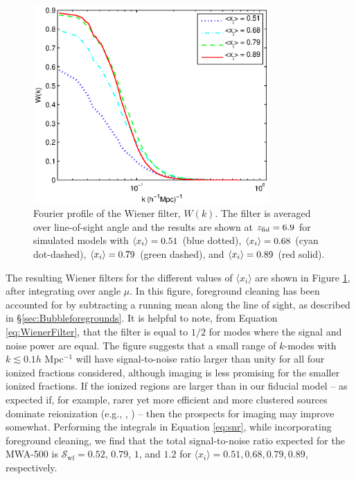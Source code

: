 \begin{figure}[h]
  \centering
  \includegraphics[width=9cm]{f1.eps}  
  \caption{Fourier profile of the Wiener filter, $W(k)$. The filter is averaged over
    line-of-sight angle and the results are shown at $z_{\rm fid} = 6.9$ for
simulated models with $\langle x_{i} \rangle = 0.51$ (blue dotted), $\langle x_{i} \rangle = 0.68$
    (cyan dot-dashed), $\langle x_{i} \rangle = 0.79$ (green dashed), and $\langle x_{i} \rangle = 0.89$ (red solid).}
  \label{fig:WienerFilter}
\end{figure}

The resulting Wiener filters for the different values of $\langle x_i \rangle$
are shown in Figure \ref{fig:WienerFilter}, after integrating over
angle $\mu$. In this figure, foreground cleaning has been accounted for by subtracting a running mean along the line of sight, as described in \S\ref{sec:Bubbleforegrounds}. It is helpful to note, from Equation
\ref{eq:WienerFilter}, that the filter is equal to $1/2$ for modes
where the signal and noise power are equal. The figure suggests that a
small range of $k$-modes with $k \lesssim 0.1 h$ Mpc$^{-1}$ will have
signal-to-noise ratio larger than unity for all four ionized fractions
considered, although imaging is less promising for the smaller ionized
fractions. If the ionized regions are larger than in our fiducial
model --  as expected if, for example, rarer yet more efficient and
more clustered sources dominate reionization
(e.g., \citealt{McQuinn:2006et}, \citealt{Lidz:2007az}) -- then the
prospects for imaging may improve somewhat. Performing the integrals
in Equation \ref{eq:snr}, while incorporating foreground cleaning, we
find that the total signal-to-noise ratio expected for the MWA-500 is
$\mathcal{S}_{\text{wf}} = 0.52$, $0.79$, $1$, and $1.2$ for
$\langle x_i \rangle = 0.51, 0.68, 0.79, 0.89$, respectively. 


